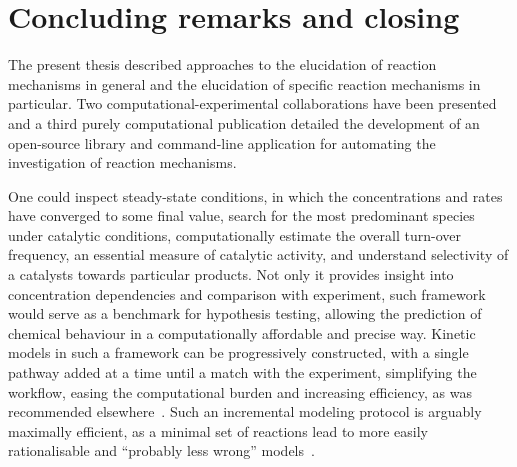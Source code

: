 \chapter{Concluding remarks and closing}%
\label{ch:conclusion}

The present thesis described approaches to the elucidation of reaction
mechanisms in general and the elucidation of specific reaction mechanisms in
particular.
Two computational-experimental collaborations have been presented and a third
purely computational publication detailed the development of an open-source
library and command-line application for automating the investigation of
reaction mechanisms.


One could inspect steady-state conditions, in which the concentrations and rates have converged to some final value, search for the most predominant species under catalytic conditions, computationally estimate the overall turn-over frequency, an essential measure of catalytic activity, and understand selectivity of a catalysts towards particular products.
Not only it provides insight into concentration dependencies and comparison with experiment, such framework would serve as a benchmark for hypothesis testing, allowing the prediction of chemical behaviour in a computationally affordable and precise way.
Kinetic models in such a framework can be progressively constructed, with a single pathway added at a time until a match with the experiment, simplifying the workflow, easing the computational burden and increasing efficiency, as was recommended elsewhere~\cite{Jara_z_2019}.
Such an incremental modeling protocol is arguably maximally efficient, as a
minimal set of reactions lead to more easily rationalisable and
``probably less wrong'' models~\cite{Blackmond_2015,Jara_z_2019}.


